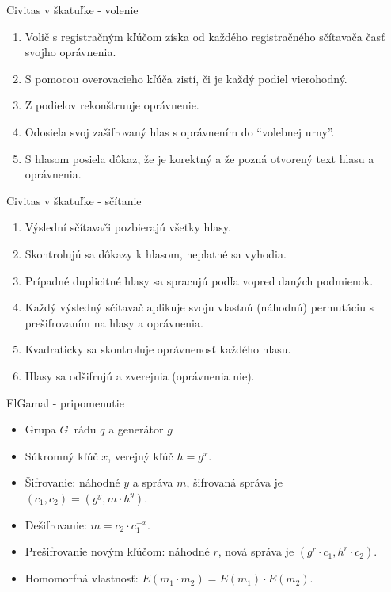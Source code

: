 \documentclass{beamer}
\begin{document}
\begin{frame}{Civitas v škatuľke - volenie}
    \begin{enumerate}
        \item Volič s registračným kľúčom získa od každého registračného sčítavača časť svojho
        oprávnenia.
        \item S pomocou overovacieho kľúča zistí, či je každý podiel vierohodný.
        \item Z podielov rekonštruuje oprávnenie.
        \item Odosiela svoj zašifrovaný hlas s oprávnením do ``volebnej urny''. 
        \item S hlasom posiela dôkaz, že je korektný a že pozná otvorený text hlasu a oprávnenia.
    \end{enumerate}
\end{frame}

\begin{frame}{Civitas v škatuľke - sčítanie}
    \begin{enumerate}
        \item Výslední sčítavači pozbierajú všetky hlasy.
        \item Skontrolujú sa dôkazy k hlasom, neplatné sa vyhodia.
        \item Prípadné duplicitné hlasy sa spracujú podľa vopred daných podmienok.
        \item Každý výsledný sčítavač aplikuje svoju vlastnú (náhodnú) permutáciu s prešifrovaním na
        hlasy a oprávnenia.
        \item Kvadraticky sa skontroluje oprávnenosť každého hlasu.
        \item Hlasy sa odšifrujú a zverejnia (oprávnenia nie).
    \end{enumerate}
\end{frame}

\begin{frame}{ElGamal - pripomenutie}
    \begin{itemize}
        \item Grupa $G$ rádu $q$ a generátor $g$
        \item Súkromný kľúč $x$, verejný kľúč $h = g^x$.
        \item Šifrovanie: náhodné $y$ a správa $m$, šifrovaná správa je $(c_1, c_2) = (g^y, m \cdot h^y)$.
        \item Dešifrovanie: $m = c_2 \cdot c_1^{-x}$.
        \item Prešifrovanie novým kľúčom: náhodné $r$, nová správa je $(g^r \cdot c_1, h^r \cdot c_2)$.

        \bigskip

        \item Homomorfná vlastnosť: $E(m_1 \cdot m_2) = E(m_1) \cdot E(m_2)$.
    \end{itemize}
\end{frame}
\end{document}
